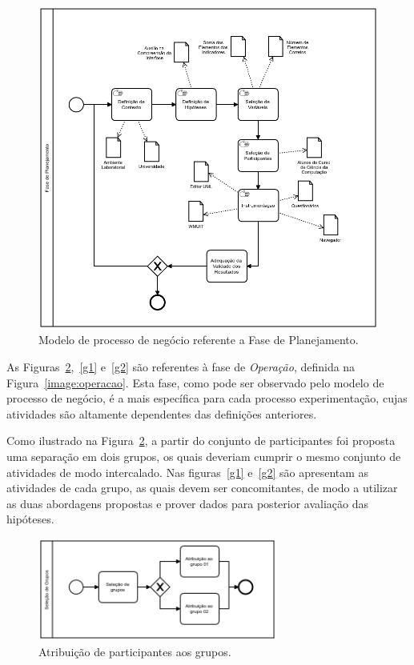 \begin{figure}[!ht]
\centering
\includegraphics[width=\textwidth]{images/modelo-planejamento.png}
\caption{Modelo de processo de negócio referente a Fase de Planejamento.}
\label{img:modelo-planejamento}
\end{figure}

As Figuras~\ref{selecao},~\ref{g1} e~\ref{g2} são referentes à fase de \textit{Operação}, definida na Figura~\ref{image:operacao}. Esta fase, como pode ser observado pelo modelo de processo de negócio, é a mais específica para cada processo experimentação, cujas atividades são altamente dependentes das definições anteriores.

Como ilustrado na Figura~\ref{selecao}, a partir do conjunto de participantes foi proposta uma separação em dois grupos, os quais deveriam cumprir o mesmo conjunto de atividades de modo intercalado. Nas figuras~\ref{g1} e~\ref{g2} são apresentam as atividades de cada grupo, as quais devem ser concomitantes, de modo a utilizar as duas abordagens propostas e prover dados para posterior avaliação das hipóteses.

\begin{figure}[!ht]
\centering
\includegraphics[width=0.7\textwidth]{images/selecao.png}
\caption{Atribuição de participantes aos grupos.}
\label{selecao}
\end{figure}


